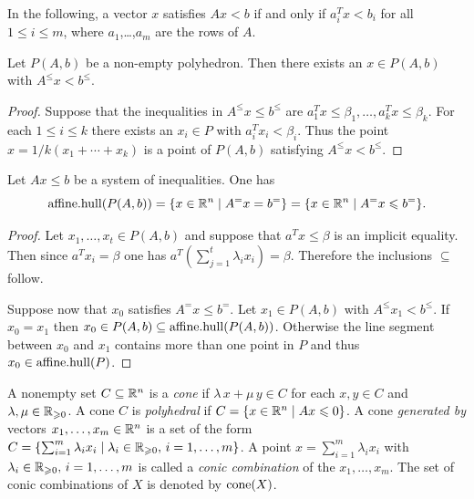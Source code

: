 In the following, a vector $x$ satisfies $Ax < b$ if and only if
$a_i^T x < b_i$ for all $1\leq i\leq m$, where $a_1$,\ldots,$a_m$ are the rows of $A$.

\begin{lemma}
  \label{po:lem:3}
  Let $P(A,b)$ be a non-empty polyhedron.
  Then there exists an $x \in P(A,b)$ with $A^\leq x<b^\leq$. 
\end{lemma}
\begin{proof}
  Suppose that the inequalities in  $A^\leq x\leq b^\leq$ are $a_1^Tx\leq\beta_1
  ,\ldots,a_k^Tx\leq\beta_k$. For each $1\leq i\leq k$ there exists an $x_i \in P$ with
  $a_i^Tx_i<\beta_i$. Thus the point $x = 1/k (x_1+\cdots+x_k)$ is a point of
  $P(A,b)$ satisfying  $A^\leq x<b^\leq$. 
\end{proof}


\begin{lemma}
  \label{po:lem:2}
  Let $Ax\leq b$ be a system of inequalities. One has 
  \begin{displaymath}
    \mathrm{affine.hull}(P(A,b)) = \{ x \in \mathbb{R}^n \mid A^=x = b^=\} = \{ x \in \mathbb{R}^n \mid A^=x\leqslant b^=\}.
  \end{displaymath}
\end{lemma}
\begin{proof}
  Let $x_1,\ldots,x_t \in P(A,b)$ and suppose that $a^Tx\leq\beta$ is an
  implicit equality. Then since $a^Tx_i = \beta$ one has
  $a^T(\sum_{j=1}^t\lambda_ix_i) = \beta$. Therefore the inclusions $\subseteq$
  follow. 

  Suppose now that $x_0$ satisfies $A^=x\leq b^=$. Let $x_1 \in P(A,b)$
  with $A^\leq x_1<b^\leq$. If $x_0=x_1$ then $x_0 \in P(A,b) \subseteq
  \mathrm{affine.hull}(P(A,b))$.  Otherwise the line segment between $x_0$ and
  $x_1$ contains more than one point in $P$ and thus $x_0 \in
  \mathrm{affine.hull}(P)$. 
\end{proof}








A nonempty set  $C\subseteq\mathbb{R}^n$ is a \emph{cone} if $\lambda\, x + \mu\,y \in C$
for each $x,y\in C$ and $\lambda,\mu\in \mathbb{R}_{\geqslant0}$. A cone  $C$ is \emph{polyhedral}
if $C = \{ x \in \mathbb{R}^n \mid Ax\leqslant0\}$. A cone \emph{generated by} vectors
$x_1,\ldots,x_m \in \mathbb{R}^n$ is a set of the form $C = \{ \sum_{i=1}^m \lambda_i x_i
\mid \lambda_i\in \mathbb{R}_{\geqslant0}, \, i=1,\ldots,m\}$.   A point $x = \sum_{i=1}^m \lambda_i x_i$
with  $\lambda_i\in \mathbb{R}_{\geqslant0}, \, i=1,\ldots,m$ is called a \emph{conic
  combination}   of the $x_1,\ldots,x_m$. The set of conic combinations of
$X$ is denoted by $\mathrm{cone}(X)$. 


